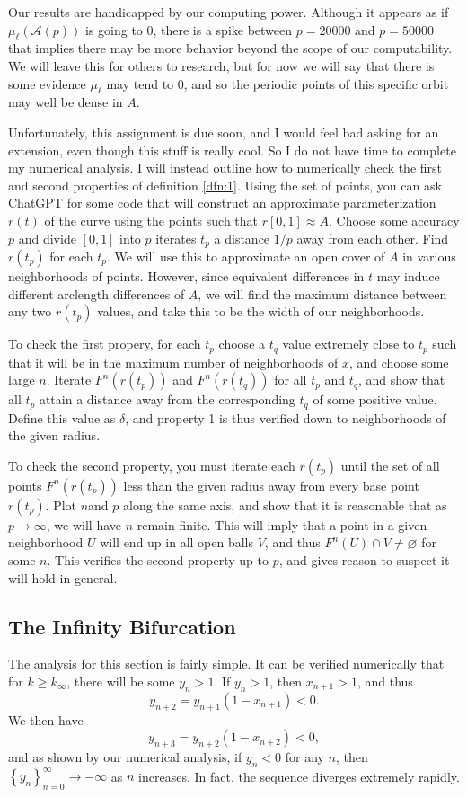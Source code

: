 \documentclass[11pt, letterpaper]{article}
\begin{document}
Our results are handicapped by our computing power. Although it appears as if $\mu_\ell (\mathcal{A} (p))$ is going to $0$, there is a spike between $p=20000$ and $p=50000$ that implies there may be more behavior beyond the scope of our computability. We will leave this for others to research, but for now we will say that there is some evidence $\mu_\ell $ may tend to $0$, and so the periodic points of this specific orbit may well be dense in $A$.

Unfortunately, this assignment is due soon, and I would feel bad asking for an extension, even though this stuff is really cool. So I do not have time to complete my numerical analysis. I will instead outline how to numerically check the first and second properties of definition \ref{dfn:1}. Using the set of points, you can ask ChatGPT for some code that will construct an approximate parameterization $r(t)$ of the curve using the points such that $r[0,1]\approx A$. Choose some accuracy $p$ and divide $[0,1]$ into $p$ iterates $t_p$ a distance $1 / p$ away from each other. Find $r(t_p)$ for each $t_p$. We will use this to approximate an open cover of $A$ in various neighborhoods of points. However, since equivalent differences in $t$ may induce different arclength differences of $A$, we will find the maximum distance between any two $r(t_p)$ values, and take this to be the width of our neighborhoods.

To check the first propery, for each $t_p$ choose a $t_q$ value extremely close to $t_p$ such that it will be in the maximum number of neighborhoods of $x$, and choose some large $n$. Iterate $F^n(r(t_p))$ and $F^n(r(t_q))$ for all $t_p$ and $t_q$, and show that all $t_p$ attain a distance away from the corresponding $t_q$ of some positive value. Define this value as $\delta $, and property 1 is thus verified down to neighborhoods of the given radius.

To check the second property, you must iterate each  $r(t_p)$ until the set of all points $F^n(r(t_p))$ less than the given radius away from every base point $r(t_p)$. Plot $n$and $p$ along the same axis, and show that it is reasonable that as $p\to \infty$, we will have $n$ remain finite. This will imply that a point in a given neighborhood $U$ will end up in all open balls $V$, and thus $F^n(U)\cap V\neq \varnothing$ for some $n$. This verifies the second property up to $p$, and gives reason to suspect it will hold in general.
\subsection{The Infinity Bifurcation}
The analysis for this section is fairly simple. It can be verified numerically that for $k\geq k_{\infty}$, there will be some $y_n>1$. If $y_n>1$, then $x_{n+1}>1$, and thus
\[
	y_{n+2}=y_{n+1}\left( 1-x_{n+1} \right) <0
.\]
We then have
\[
	y_{n+3}=y_{n+2}\left( 1-x_{n+2} \right) <0
,\]
and as shown by our numerical analysis, if $y_n<0$ for any $n$, then $\left\{ y_n \right\}_{n=0}^\infty\to -\infty$ as $n$ increases. In fact, the sequence diverges extremely rapidly.
\end{document}
